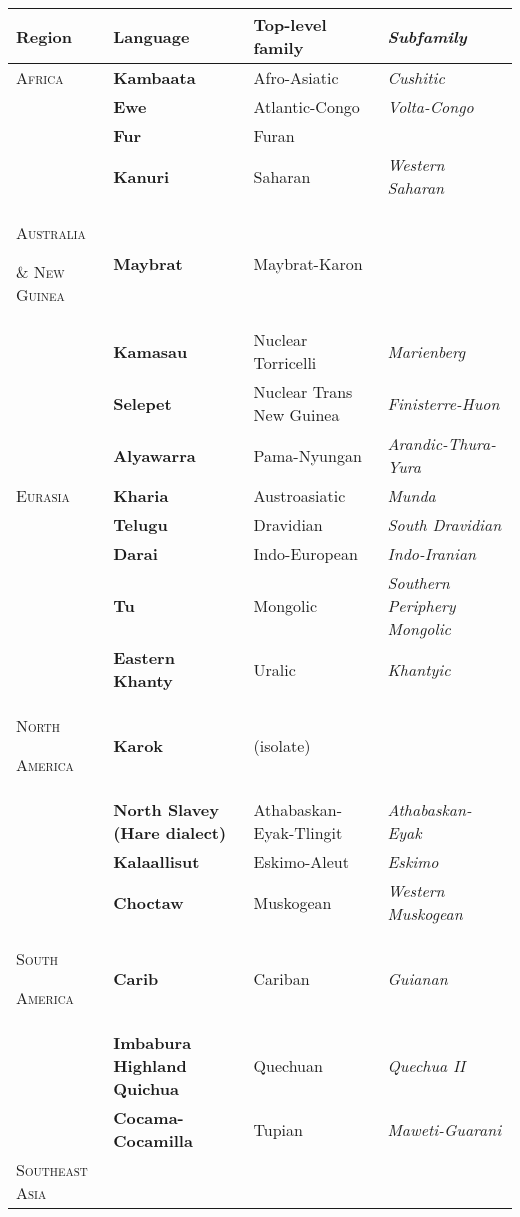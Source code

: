\documentclass[12pt]{article}
\begin{document}
\clearpage\begin{flushleft}
\tablefirsthead{}
\tablehead{}
\tabletail{}
\tablelasttail{}
\begin{supertabular}{m{1.2205598in}m{1.6719599in}m{1.6400598in}m{1.6420599in}}
\hline
{\bfseries Region} &
{\bfseries Language} &
{\bfseries Top-level family} &
{\bfseries\itshape Subfamily}\\\hline
{\scshape Africa} &
{\bfseries Kambaata} &
Afro-Asiatic &
{\itshape Cushitic}\\\hhline{-~~~}
 &
{\bfseries Ewe} &
Atlantic-Congo &
{\itshape Volta-Congo}\\
 &
{\bfseries Fur} &
Furan &
\\
 &
{\bfseries Kanuri} &
Saharan &
{\itshape Western Saharan}\\\hline
{\scshape Australia }

{\scshape \& New Guinea} &
{\bfseries Maybrat} &
Maybrat-Karon &
\\\hhline{-~~~}
 &
{\bfseries Kamasau} &
Nuclear Torricelli &
{\itshape Marienberg}\\
 &
{\bfseries Selepet} &
Nuclear Trans New Guinea &
{\itshape Finisterre-Huon}\\
 &
{\bfseries Alyawarra} &
Pama-Nyungan &
{\itshape Arandic-Thura-Yura}\\\hline
{\scshape Eurasia} &
{\bfseries Kharia} &
Austroasiatic &
{\itshape Munda}\\\hhline{-~~~}
 &
{\bfseries Telugu} &
Dravidian &
{\itshape South Dravidian}\\
 &
{\bfseries Darai} &
Indo-European &
{\itshape Indo-Iranian}\\
 &
{\bfseries Tu} &
Mongolic &
{\itshape Southern Periphery Mongolic}\\
 &
{\bfseries Eastern Khanty} &
Uralic &
{\itshape Khantyic}\\\hline
{\scshape North }

{\scshape America} &
{\bfseries Karok} &
(isolate) &
\\\hhline{-~~~}
 &
{\bfseries North Slavey \newline
(Hare dialect)} &
Athabaskan-Eyak-Tlingit &
{\itshape Athabaskan-Eyak}\\
 &
{\bfseries Kalaallisut} &
Eskimo-Aleut &
{\itshape Eskimo}\\
 &
{\bfseries Choctaw} &
Muskogean &
{\itshape Western Muskogean}\\\hline
{\scshape South }

{\scshape America} &
{\bfseries Carib} &
Cariban &
{\itshape Guianan}\\\hhline{-~~~}
 &
{\bfseries Imbabura Highland Quichua} &
Quechuan &
{\itshape Quechua II}\\
 &
{\bfseries Cocama-Cocamilla} &
Tupian &
{\itshape Maweti-Guarani}\\\hline
{\scshape Southeast Asia }


\end{supertabular}
\end{flushleft}
\end{document}
